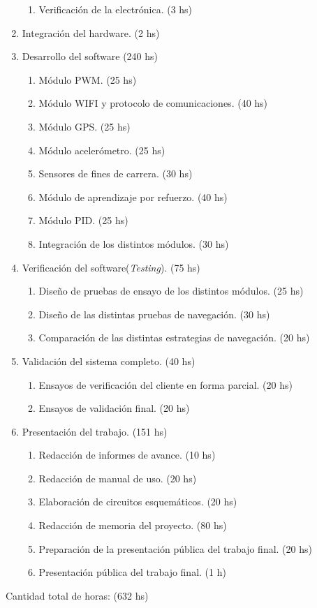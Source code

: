 \documentclass[11pt]{charter}
\begin{document}
\begin{enumerate}
\begin{enumerate}
	\item Verificación de la electrónica. (3 hs)
	\end{enumerate}	
\item Integración del hardware. (2 hs)	
\item Desarrollo del software (240 hs)
	\begin{enumerate}
	\item Módulo PWM. (25 hs)
	\item Módulo WIFI y protocolo de comunicaciones. (40 hs)
	\item Módulo GPS. (25 hs)
	\item Módulo acelerómetro.  (25 hs)
	\item Sensores de fines de carrera. (30 hs)
	\item Módulo de aprendizaje por refuerzo. (40 hs)
	\item Módulo PID. (25 hs)
	\item Integración de los distintos módulos. (30 hs)
	\end{enumerate}	
\item Verificación del software(\textit{Testing}). (75 hs)
	\begin{enumerate}
	\item Diseño de pruebas  de ensayo de los distintos módulos. (25 hs)
	\item Diseño de las distintas pruebas de navegación. (30 hs)
	\item Comparación de las distintas estrategias de navegación. (20 hs)
	\end{enumerate}	
\item Validación del sistema completo. (40 hs)
	\begin{enumerate}
	\item Ensayos de verificación del cliente en forma parcial. (20 hs)
	\item Ensayos de validación final. (20 hs)
	\end{enumerate}	
\item Presentación del trabajo. (151 hs)
	\begin{enumerate}
	\item Redacción de informes de avance. (10 hs)
	\item Redacción de manual de uso. (20 hs)
	\item Elaboración de circuitos esquemáticos. (20 hs)
	\item Redacción de memoria del proyecto. (80 hs)
	\item Preparación de la presentación pública del trabajo final. (20 hs)
	\item Presentación pública del trabajo final. (1 h)
	\end{enumerate}					
\end{enumerate}
Cantidad total de horas: (632 hs)
\end{document}
